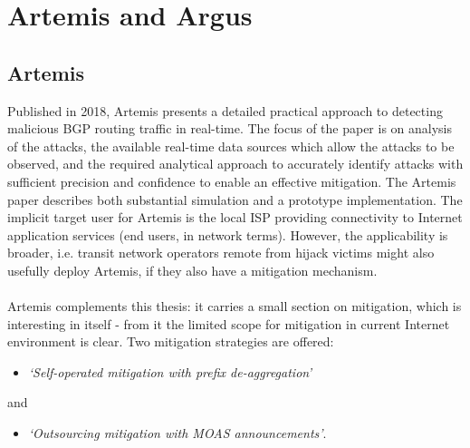 
\section{Artemis and Argus}
\subsection{Artemis}
Published in 2018, Artemis \cite{Sermpezis2018} presents a detailed practical approach to detecting malicious BGP routing traffic in real-time.  The focus of the paper is on analysis of the attacks, the available real-time data sources which allow the attacks to be observed, and the required analytical approach to accurately identify attacks with sufficient precision and confidence to enable an effective mitigation.  The Artemis paper describes both substantial simulation and a prototype implementation.  The implicit target user for Artemis is the local ISP providing connectivity to Internet application services (end users, in network terms).  However, the applicability is broader, i.e. transit network operators remote from hijack victims might also usefully deploy Artemis, if they also have a mitigation mechanism.
\\
\smallskip
\\
Artemis complements this thesis: it carries a small section on mitigation, which is interesting in itself - from it the limited scope for mitigation in current Internet environment is clear.  Two mitigation strategies are offered:

\begin{itemize}
    \item \emph{`Self-operated mitigation with prefix de-aggregation'}
\end{itemize}
and

\begin{itemize}
    \item \emph{`Outsourcing mitigation with MOAS announcements'}.
\end{itemize}

